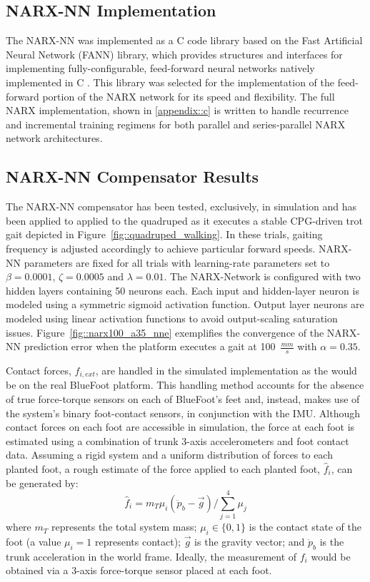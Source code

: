		\subsection{NARX-NN Implementation}

			The NARX-NN was implemented as a C code library based on the Fast Artificial Neural Network (FANN) library, which provides structures and interfaces for implementing fully-configurable, feed-forward neural networks natively implemented in C \cite{Nissen03}. This library was selected for the implementation of the feed-forward portion of the NARX network for its speed and flexibility. The full NARX implementation, shown in \ref{appendix::c} is written to handle recurrence and incremental training regimens for both parallel and series-parallel NARX network architectures.


		\subsection{NARX-NN Compensator Results}

			The NARX-NN compensator has been tested, exclusively, in simulation and has been applied to applied to the quadruped as it executes a stable CPG-driven trot gait depicted in Figure~\ref{fig::quadruped_walking}. In these trials, gaiting frequency is adjusted accordingly to achieve particular forward speeds. NARX-NN parameters are fixed for all trials with learning-rate  parameters set to $\beta=0.0001$, $\zeta=0.0005$ and $\lambda = 0.01$. The NARX-Network is configured with two hidden layers containing 50 neurons each. Each input and hidden-layer neuron is modeled using a symmetric sigmoid activation function. Output layer neurons are modeled using linear activation functions to  avoid output-scaling saturation issues. Figure~\ref{fig::narx100_a35_nne} exemplifies the convergence of the NARX-NN prediction error when the platform executes a gait at  100~$\frac{mm}{s}$ with $\alpha = 0.35$.

			Contact forces, ${f}_{i,ext}$, are handled in the simulated implementation as the would be on the real BlueFoot platform. This handling method accounts for the absence of true force-torque sensors on each of BlueFoot's feet and, instead, makes use of the system's binary foot-contact sensors, in conjunction with the IMU. Although contact forces on each foot are accessible in simulation, the force at each foot is estimated using a combination of trunk 3-axis accelerometers and foot contact data. Assuming a rigid system and a uniform distribution of forces to each planted foot, a rough estimate of the force applied to each \Ith planted foot, $\hat{f}_{i}$, can be generated by:
				\begin{equation}
					\hat{f}_{i} = {m_{T}\mu_{i}} \left(\ddot{p}_{b} - \vec{g}\right)/{\sum_{j=1}^{4}{\mu_{j}}}
				\end{equation}
			where $m_{T}$ represents the total system mass; $\mu_{i}\in \{0,1\}$ is the contact state of the \Ith
			foot (a value $\mu_{i}=1$ represents contact); $\vec{g}$ is the gravity vector; and $\ddot{p}_{b}$ is the trunk acceleration in the world frame. Ideally, the measurement of ${f}_{i}$ would be obtained via a 3-axis force-torque sensor placed at each foot.

